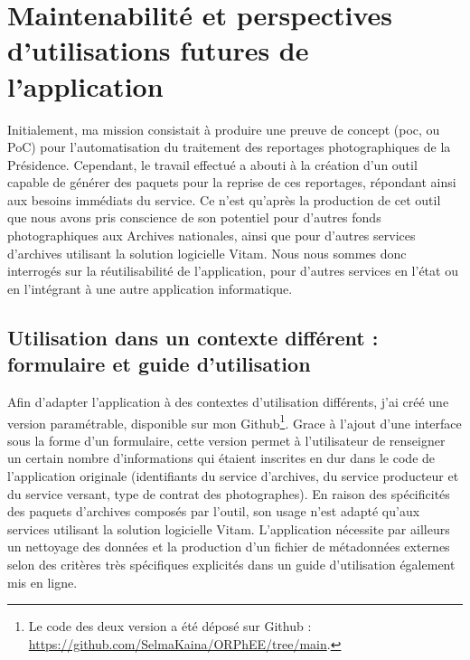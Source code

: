 \chapter{Maintenabilité et perspectives d'utilisations futures de l'application}

Initialement, ma mission consistait à produire une preuve de concept (\gls{poc}, ou PoC) pour l'automatisation du traitement des reportages photographiques de la Présidence. Cependant, le travail effectué a abouti à la création d'un outil capable de générer des paquets pour la reprise de ces reportages, répondant ainsi aux besoins immédiats du service. Ce n'est qu'après la production de cet outil que nous avons pris conscience de son potentiel pour d'autres fonds photographiques aux Archives nationales, ainsi que pour d'autres services d'archives utilisant la solution logicielle Vitam. Nous nous sommes donc interrogés sur la réutilisabilité de l'application, pour d'autres services en l'état ou en l'intégrant à une autre application informatique.

\section{Utilisation dans un contexte différent : formulaire et guide d'utilisation}

Afin d'adapter l'application à des contextes d'utilisation différents, j'ai créé une version paramétrable, disponible sur mon Github\footnote{Le code des deux version a été déposé sur Github : \url{ https://github.com/SelmaKaina/ORPhEE/tree/main}.}. Grace à l'ajout d'une interface sous la forme d'un formulaire, cette version permet à l'utilisateur de renseigner un certain nombre d'informations qui étaient inscrites en dur dans le code de l'application originale (identifiants du service d’archives, du service producteur et du service versant, type de contrat des photographes). En raison des spécificités des paquets d'archives composés par l'outil, son usage n'est adapté qu'aux services utilisant la solution logicielle Vitam. L'application nécessite par ailleurs un nettoyage des données et la production d’un fichier de métadonnées externes selon des critères très spécifiques explicités dans un guide d'utilisation également mis en ligne.

